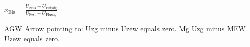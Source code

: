 \( x_{\text{Eis}} = \frac{U_{\text{ZEis}} - U_{\text{Flüssig}}}{U_{\text{Fest}} - U_{\text{Flüssig}}} \)

AGW  
Arrow pointing to: Uzg minus Uzew equals zero.  
Mg Uzg minus MEW Uzew equals zero.